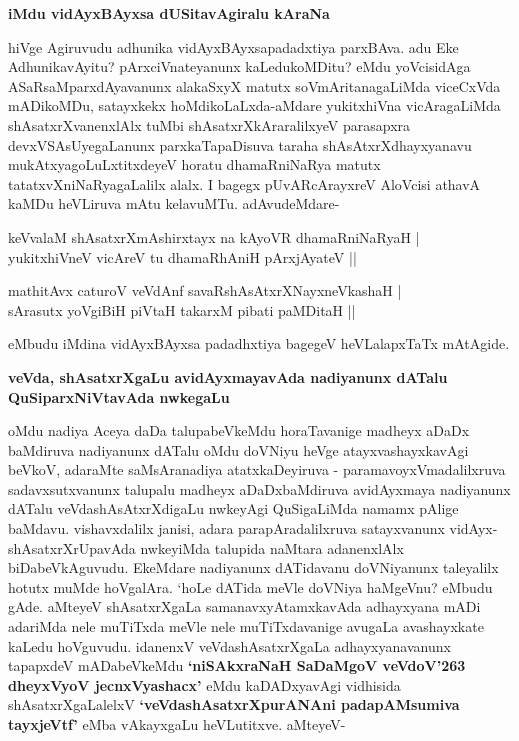 {\bigskip
\noindent
{\large\bf iMdu vidAyxBAyxsa dUSitavAgiralu kAraNa}}\label{page12}
\medskip

\noindent
hiVge Agiruvudu adhunika vidAyxBAyxsapadadxtiya parxBAva. adu Eke Adhunika\break\-vAyitu? pArxciVnate\-yanunx kaLedukoMDitu? eMdu yoVcisidAga ASaRsaMparx\-dAyavanunx alakaSxyX matutx soVmAri\-tana\-gaLiMda viceCxVda mADikoMDu, satayxkekx hoMdikoLaLxda-aMdare yukitxhiVna vicAragaLiMda shAsatxrX\-vanenxlAlx tuMbi shAsatxrXkAra\-ralilxyeV parasapxra devxVSAsUyegaLanunx parxkaTapaDisuva taraha shAsAtxrXdhayxyanavu mukAtxya\-goLuLx\-titxdeyeV horatu dhamaRniNaRya matutx tatatxvXniNaRyagaLalilx  alalx. I bagegx pUvAR\-cArayxreV AloVcisi athavA kaMDu heVLiruva mAtu kelavuMTu. adAvudeMdare-

\begin{shloka}
keVvalaM shAsatxrXmAshirxtayx na kAyoVR dhamaRniNaRyaH |\\\label{64}
yukitxhiVneV vicAreV tu dhamaRhAniH pArxjAyateV ||
\end{shloka}

\smallskip

\begin{shloka}
mathitAvx caturoV veVdAnf savaRshAsAtxrXNayxneVkashaH |\\\label{41}
sArasutx yoVgiBiH piVtaH takarxM pibati paMDitaH ||
\end{shloka}
eMbudu iMdina vidAyxBAyxsa padadhxtiya bagegeV heVLalapxTaTx mAtAgide.

{\bigskip
\noindent
{\large\bf veVda, shAsatxrXgaLu avidAyxmayavAda nadiyanunx dATalu QuSiparxNiVtavAda nwkegaLu}}\label{page42}
\medskip

\noindent
oMdu nadiya Aceya daDa talupabeVkeMdu horaTavanige madheyx aDaDx baMdiruva nadiyanunx dATalu oMdu doVNiyu heVge atayxvashayxkavAgi beVkoV, adaraMte saMsAranadiya atatxkaDeyiruva - parama\-voyxVmadalilxruva sadavxsutxvanunx talupalu madheyx aDaDxbaMdiruva avidAyxmaya nadiyanunx dATalu veVda\-shAsAtxrXdigaLu nwkeyAgi QuSigaLiMda namamx pAlige baMdavu. vishavxdalilx janisi, adara parapAradalilx\-ruva satayxvanunx vidAyx-shAsatxrXrUpavAda nwkeyiMda talupida naMtara adanenxlAlx biDabeVkAguvudu. EkeM\-dare nadiyanunx dATidavanu doVNiyanunx taleyalilx hotutx muMde hoVgalAra. `hoLe dATida meVle doVNiya haMgeVnu? eMbudu gAde. aMteyeV shAsatxrXgaLa samanavxyAtamxkavAda adhayxyana mADi adariMda nele muTiTxda meVle nele muTiTxdavanige avugaLa avashayxkate kaLedu hoVguvudu. idanenxV\- veVda\-shAsatxrX\-gaLa adhayxyanavanunx tapapxdeV mADabeVkeMdu {\bf `niSAkxraNaH SaDaMgoV\label{42} veVdoV\char'263 dheyxVyoV jecnxVyashacx'} eMdu kaDADxyavAgi vidhisida shAsatxrXgaLalelxV  {\bf `veVdashAsatxrXpurANAni padapAMsumiva tayxjeVtf'\label{42}} eMba vAkayx\-gaLu heVLutitxve. aMteyeV-

